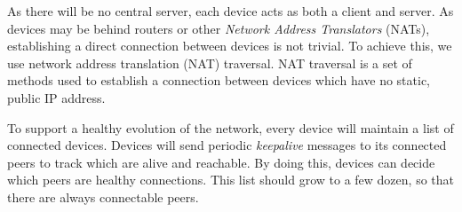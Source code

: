 As there will be no central server, each device acts as both a client and server. As devices may be behind routers or other \textit{Network Address Translators} (NATs), establishing a direct connection between devices is not trivial. To achieve this, we use network address translation (NAT) traversal. NAT traversal is a set of methods used to establish a connection between devices which have no static, public IP address.

To support a healthy evolution of the network, every device will maintain a list of connected devices. Devices will send periodic \textit{keepalive} messages to its connected peers to track which are alive and reachable. By doing this, devices can decide which peers are healthy connections. This list should grow to a few dozen, so that there are always connectable peers.






